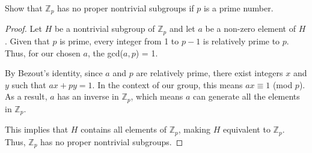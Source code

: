 \documentclass[12pt]{amsart}
\theoremstyle{definition}
\numberwithin{equation}{section}
\theoremstyle{plain}
\newcommand{\Z}{\mathbb{Z}}
\begin{document}
    \begin{exercise}{55} Show that $\Z_p$ has no proper nontrivial subgroups if $p$ is a prime number.

        \begin{proof}
        Let \( H \) be a nontrivial subgroup of \( \Z_p \) and let \( a \) be a non-zero element of \( H \). Given that \( p \) is prime, every integer from 1 to \( p-1 \) is relatively prime to \( p \). Thus, for our chosen \( a \), the gcd(\( a, p \)) = 1.
        
        By Bezout's identity, since \( a \) and \( p \) are relatively prime, there exist integers \( x \) and \( y \) such that \( ax + py = 1 \). In the context of our group, this means \( ax \equiv 1 \) (mod \( p \)). As a result, \( a \) has an inverse in \( \Z_p \), which means \( a \) can generate all the elements in \( \Z_p \). 
        
        This implies that \( H \) contains all elements of \( \Z_p \), making \( H \) equivalent to \( \Z_p \). Thus, \( \Z_p \) has no proper nontrivial subgroups.
        \end{proof}
    \end{exercise}
    
\end{document}
